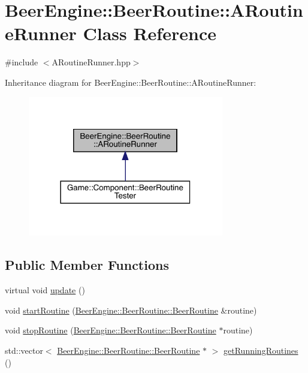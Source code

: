 \hypertarget{class_beer_engine_1_1_beer_routine_1_1_a_routine_runner}{}\section{Beer\+Engine\+:\+:Beer\+Routine\+:\+:A\+Routine\+Runner Class Reference}
\label{class_beer_engine_1_1_beer_routine_1_1_a_routine_runner}


{\ttfamily \#include $<$A\+Routine\+Runner.\+hpp$>$}



Inheritance diagram for Beer\+Engine\+:\+:Beer\+Routine\+:\+:A\+Routine\+Runner\+:
\nopagebreak
\begin{figure}[H]
\begin{center}
\leavevmode
\includegraphics[width=242pt]{class_beer_engine_1_1_beer_routine_1_1_a_routine_runner__inherit__graph}
\end{center}
\end{figure}
\subsection*{Public Member Functions}
\begin{DoxyCompactItemize}
\item 
virtual void \mbox{\hyperlink{class_beer_engine_1_1_beer_routine_1_1_a_routine_runner_a7a5253cb3a64dcb1aa66806fe7c12f62}{update}} ()
\item 
void \mbox{\hyperlink{class_beer_engine_1_1_beer_routine_1_1_a_routine_runner_a39c1caf6c18c8f6e2821dc490226279f}{start\+Routine}} (\mbox{\hyperlink{class_beer_engine_1_1_beer_routine_1_1_beer_routine}{Beer\+Engine\+::\+Beer\+Routine\+::\+Beer\+Routine}} \&routine)
\item 
void \mbox{\hyperlink{class_beer_engine_1_1_beer_routine_1_1_a_routine_runner_a3c4bff92fb1bad462946a3b48e62a44e}{stop\+Routine}} (\mbox{\hyperlink{class_beer_engine_1_1_beer_routine_1_1_beer_routine}{Beer\+Engine\+::\+Beer\+Routine\+::\+Beer\+Routine}} $\ast$routine)
\item 
std\+::vector$<$ \mbox{\hyperlink{class_beer_engine_1_1_beer_routine_1_1_beer_routine}{Beer\+Engine\+::\+Beer\+Routine\+::\+Beer\+Routine}} $\ast$ $>$ \mbox{\hyperlink{class_beer_engine_1_1_beer_routine_1_1_a_routine_runner_a6f8c4cb25ea70365de58a6dfba860d96}{get\+Running\+Routines}} ()
\end{DoxyCompactItemize}
